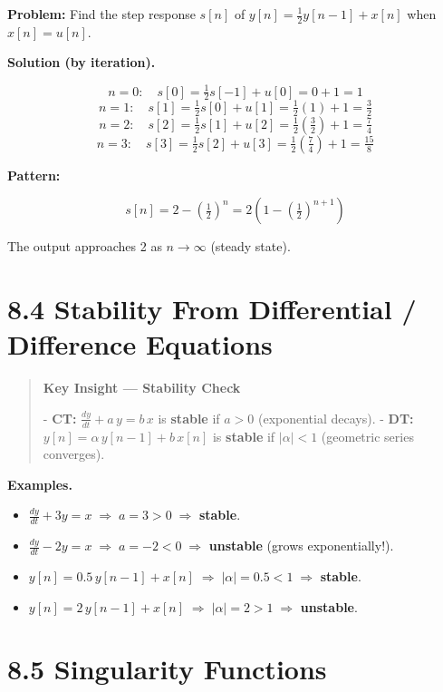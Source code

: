 \documentclass[11pt]{article}
\begin{document}
\textbf{Problem:} Find the step response $s[n]$ of $y[n] = \tfrac{1}{2}y[n-1] + x[n]$ when $x[n] = u[n]$.

\textbf{Solution (by iteration).}

\[n = 0:\quad s[0] = \tfrac{1}{2}s[-1] + u[0] = 0 + 1 = 1\]
\[n = 1:\quad s[1] = \tfrac{1}{2}s[0] + u[1] = \tfrac{1}{2}(1) + 1 = \tfrac{3}{2}\]
\[n = 2:\quad s[2] = \tfrac{1}{2}s[1] + u[2] = \tfrac{1}{2}\!\left(\tfrac{3}{2}\right) + 1 = \tfrac{7}{4}\]
\[n = 3:\quad s[3] = \tfrac{1}{2}s[2] + u[3] = \tfrac{1}{2}\!\left(\tfrac{7}{4}\right) + 1 = \tfrac{15}{8}\]

\textbf{Pattern:}

\[s[n] = 2 - \left(\tfrac{1}{2}\right)^n = 2\!\left(1 - \left(\tfrac{1}{2}\right)^{n+1}\right)\]

The output approaches 2 as $n\to\infty$ (steady state).

\section*{8.4 Stability From Differential / Difference Equations}

\begin{quote}
\textbf{Key Insight — Stability Check}

- \textbf{CT:} $\tfrac{dy}{dt} + a\,y = b\,x$ is \textbf{stable} if $a > 0$ (exponential decays).
- \textbf{DT:} $y[n] = \alpha\,y[n-1] + b\,x[n]$ is \textbf{stable} if $|\alpha| < 1$ (geometric series converges).
\end{quote}

\textbf{Examples.}

\begin{itemize}
  \item $\frac{dy}{dt} + 3y = x\;\Rightarrow\;a = 3 > 0\;\Rightarrow$ \textbf{stable}.
  \item $\frac{dy}{dt} - 2y = x\;\Rightarrow\;a = -2 < 0\;\Rightarrow$ \textbf{unstable} (grows exponentially!).
  \item $y[n] = 0.5\,y[n-1] + x[n]\;\Rightarrow\;|\alpha| = 0.5 < 1\;\Rightarrow$ \textbf{stable}.
  \item $y[n] = 2\,y[n-1] + x[n]\;\Rightarrow\;|\alpha| = 2 > 1\;\Rightarrow$ \textbf{unstable}.
\end{itemize}

\section*{8.5 Singularity Functions}
\end{document}
